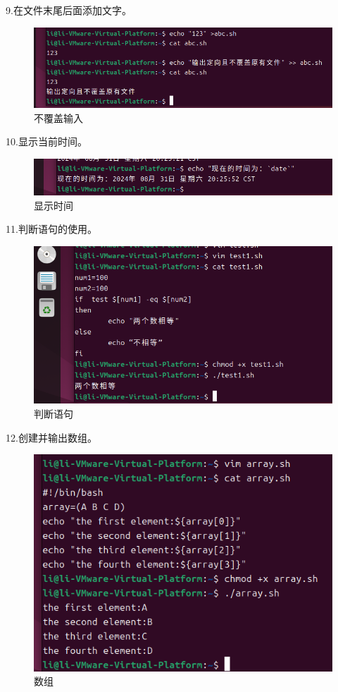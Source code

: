 \documentclass[a4paper, 12pt]{article}
\begin{document}
9.在文件末尾后面添加文字。
\begin{figure}[H]
  \centering
  \includegraphics[width=1\textwidth]{屏幕截图 2024-09-01 233917.png}
  \caption{不覆盖输入}
    \end{figure}


10.显示当前时间。
\begin{figure}[H]
  \centering
  \includegraphics[width=1\textwidth]{屏幕截图 2024-08-31 202609.png}
  \caption{显示时间}
    \end{figure}

11.判断语句的使用。
\begin{figure}[H]
  \centering
  \includegraphics[width=1\textwidth]{屏幕截图 2024-09-01 205629.png}
  \caption{判断语句}
    \end{figure}
\newpage
12.创建并输出数组。
\begin{figure}[H]
  \centering
  \includegraphics[width=1\textwidth]{屏幕截图 2024-08-31 195429.png}
  \caption{数组}
    \end{figure}
\end{document}
